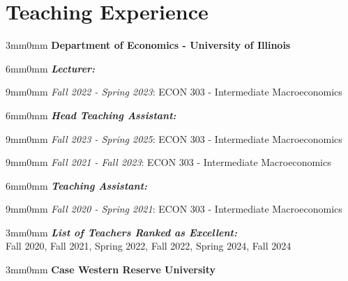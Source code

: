 \documentclass[letterpaper,11pt]{article}
\begin{document}
\section{Teaching Experience}
\begin{adjustwidth}{3mm}{0mm}
\textbf{Department of Economics - University of Illinois}
\end{adjustwidth}

\begin{adjustwidth}{6mm}{0mm}
  \textbf{\textit{Lecturer:}}
\end{adjustwidth}

\begin{adjustwidth}{9mm}{0mm}
  \textit{Fall 2022 - Spring 2023}: ECON 303 - Intermediate Macroeconomics
\end{adjustwidth}

\begin{adjustwidth}{6mm}{0mm}
  \textbf{\textit{Head Teaching Assistant:}}
\end{adjustwidth}

\begin{adjustwidth}{9mm}{0mm}
  \textit{Fall 2023 - Spring 2025}: ECON 303 - Intermediate Macroeconomics
\end{adjustwidth}

\begin{adjustwidth}{9mm}{0mm}
  \textit{Fall 2021 - Fall 2023}: ECON 303 - Intermediate Macroeconomics
\end{adjustwidth}

\begin{adjustwidth}{6mm}{0mm}
  \textbf{\textit{Teaching Assistant:}}
\end{adjustwidth}

\begin{adjustwidth}{9mm}{0mm}
  \textit{Fall 2020 - Spring 2021}: ECON 303 - Intermediate Macroeconomics
\end{adjustwidth}
\vspace{2mm}
\begin{adjustwidth}{3mm}{0mm}
  \textbf{\textit{List of Teachers Ranked as Excellent:}}
  \\
  Fall 2020, Fall 2021, Spring 2022, Fall 2022, Spring 2024, Fall 2024
\end{adjustwidth}

\vspace{2mm}

\begin{adjustwidth}{3mm}{0mm}
  \textbf{Case Western Reserve University}
\end{adjustwidth}
\end{document}
